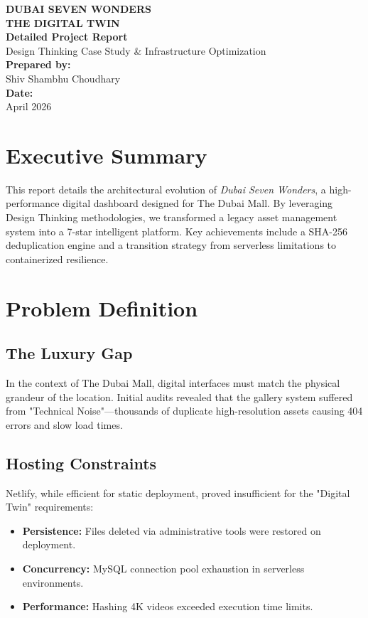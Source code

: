 \documentclass[12pt,a4paper]{report}
\begin{document}
\begin{titlepage}
    \centering
    \vspace*{1cm}
    {\Huge \bfseries \color{gold} DUBAI SEVEN WONDERS}\\[0.5cm]
    {\huge \bfseries THE DIGITAL TWIN}\\[2cm]
    {\Large \bfseries Detailed Project Report}\\[0.8cm]
    {\large Design Thinking Case Study \& Infrastructure Optimization}\\[4cm]
    
    \vfill
    {\large \textbf{Prepared by:}} \\
    {\large Shiv Shambhu Choudhary} \\[1cm]
    {\large \textbf{Date:}} \\
    {\large April 2026}
\end{titlepage}

\onehalfspacing
\tableofcontents
\newpage

\chapter{Executive Summary}
This report details the architectural evolution of \textit{Dubai Seven Wonders}, a high-performance digital dashboard designed for The Dubai Mall. By leveraging Design Thinking methodologies, we transformed a legacy asset management system into a 7-star intelligent platform. Key achievements include a SHA-256 deduplication engine and a transition strategy from serverless limitations to containerized resilience.

\chapter{Problem Definition}
\section{The Luxury Gap}
In the context of The Dubai Mall, digital interfaces must match the physical grandeur of the location. Initial audits revealed that the gallery system suffered from "Technical Noise"---thousands of duplicate high-resolution assets causing 404 errors and slow load times.

\section{Hosting Constraints}
Netlify, while efficient for static deployment, proved insufficient for the "Digital Twin" requirements:
\begin{itemize}
    \item \textbf{Persistence:} Files deleted via administrative tools were restored on deployment.
    \item \textbf{Concurrency:} MySQL connection pool exhaustion in serverless environments.
    \item \textbf{Performance:} Hashing 4K videos exceeded execution time limits.
\end{itemize}
\end{document}
